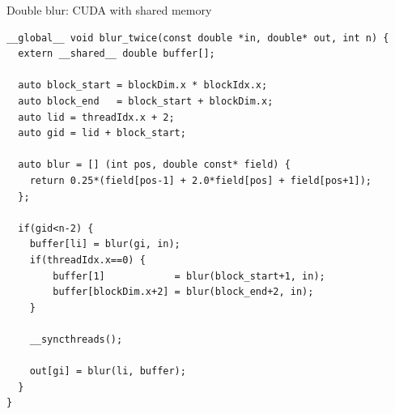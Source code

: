 \begin{frame}[fragile]{}
    \begin{code}{Double blur: CUDA with shared memory}
        \begin{lstlisting}[style=boxcudatiny]
__global__ void blur_twice(const double *in, double* out, int n) {
  extern __shared__ double buffer[];

  auto block_start = blockDim.x * blockIdx.x;
  auto block_end   = block_start + blockDim.x;
  auto lid = threadIdx.x + 2;
  auto gid = lid + block_start;

  auto blur = [] (int pos, double const* field) {
    return 0.25*(field[pos-1] + 2.0*field[pos] + field[pos+1]);
  };

  if(gid<n-2) {
    buffer[li] = blur(gi, in);
    if(threadIdx.x==0) {
        buffer[1]            = blur(block_start+1, in);
        buffer[blockDim.x+2] = blur(block_end+2, in);
    }

    __syncthreads();

    out[gi] = blur(li, buffer);
  }
}
        \end{lstlisting}
    \end{code}
\end{frame}


